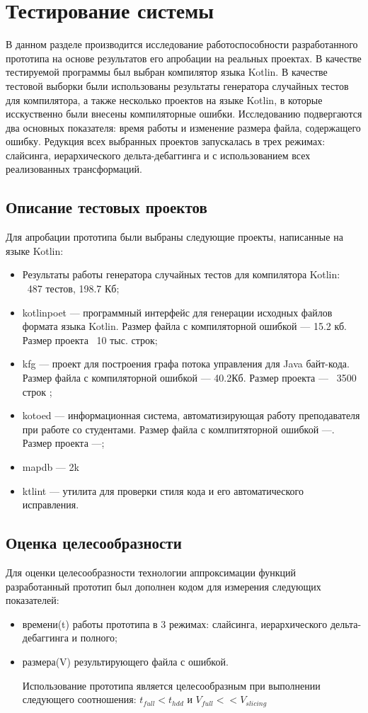 \chapter{Тестирование системы}

В данном разделе производится исследование работоспособности разработанного прототипа на основе результатов его апробации на реальных проектах. В качестве тестируемой программы был выбран компилятор языка Kotlin. В качестве тестовой выборки были использованы результаты генератора случайных тестов для компилятора, а также несколько проектов на языке Kotlin, в которые исскуственно были внесены компиляторные ошибки. Исследованию подвергаются два основных показателя: время работы и изменение размера файла, содержащего ошибку. Редукция всех выбранных проектов запускалась в трех режимах: слайсинга, иерархического дельта-дебаггинга и с использованием всех реализованных трансформаций.
\section{Описание тестовых проектов}
Для апробации прототипа были выбраны следующие проекты, написанные на языке Kotlin:
\begin{itemize}
\item Результаты работы генератора случайных тестов для компилятора Kotlin: ~487 тестов, 198.7 Кб;
\item kotlinpoet --- программный интерфейс для генерации исходных файлов формата языка Kotlin. Размер файла с компиляторной ошибкой --- 15.2 кб. Размер проекта ~10 тыс. строк;
\item kfg --- проект для построения графа потока управления для Java байт-кода. Размер файла с компиляторной ошибкой --- 40.2Кб. Размер проекта --- ~3500 строк  ;
\item kotoed --- информационная система, автоматизирующая работу преподавателя при работе со студентами. Размер файла с комлпитяторной ошибкой ---. Размер проекта ---;
\item mapdb --- 2k
\item ktlint --- утилита для проверки стиля кода и его автоматического исправления.
\end{itemize}


\section{Оценка целесообразности}
Для оценки целесообразности технологии аппроксимации функ­ций разработанный прототип был дополнен кодом для измерения следующих показателей:
\begin{itemize}
	\item времени(t) работы прототипа в 3 режимах: слайсинга, иерархического дельта-дебаггинга и полного;
	\item размера(V) результирующего файла с ошибкой.
	
Использование прототипа является целесообразным при выполнении следующего соотношения: $t_{full} < t_{hdd}$ и $V_{full} << V_{slicing}$
\end{itemize}


